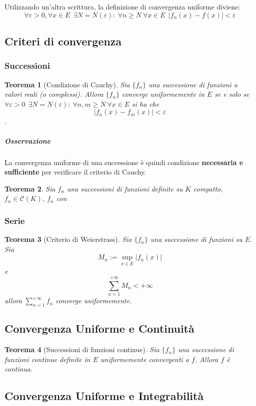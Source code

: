\documentclass[a4paper,12pt]{article}
\newtheorem{teo}{Teorema}
\begin{document}
Utilizzando un'altra scrittura, la definizione di convergenza uniforme diviene:
 $$\forall \varepsilon>0, \forall x \in E\ \ \exists N=N(\varepsilon):\ \forall n \geq N\ \forall x\in E\ \ |f_n(x) - f(x)| < \varepsilon$$ 

\subsection{Criteri di convergenza}

\subsubsection{Successioni}
\begin{teo}[Condizione di Cauchy]
Sia $\{f_n\}$ una successione di funzioni a valori reali (o complessi). Allora $\{f_n\}$ converge uniformemente in $E$ se e solo se $\forall \varepsilon>0\ \ \exists N=N(\varepsilon):\ \forall n,m \geq N\ \forall x\in E$ si ha che 
$$|f_n(x) - f_m(x)| < \varepsilon$$.
\end{teo}
\subparagraph*{Osservazione}
La convergenza uniforme di una successione è quindi condizione \textbf{necessaria e sufficiente} per verificare il criterio di Cauchy.
\begin{teo}
Sia ${f_n}$ una successioni di funzioni definite su $K$ compatto, $f_n \in \mathscr{C}(K)$, $f_n$ con
\end{teo}
\subsubsection{Serie}

\begin{teo}[Criterio di Weierstrass]
Sia $\{f_n\}$ una successione di funzioni su $E$. Sia $$M_n:= \displaystyle\sup_{x\in E}|f_n(x)|$$ e $$\sum_{n=1}^{+\infty}M_n<+\infty$$
allora $\displaystyle\sum_{n=1}^{+\infty}f_n$ converge uniformemente.
\end{teo}
\subsection{Convergenza Uniforme e Continuità}
\begin{teo}[Successioni di funzioni continue]
Sia $\{f_n\}$ una successione di funzioni continue definite in $E$ uniformemente convergenti a $f$. Allora $f$ è continua.
\end{teo}
\subsection{Convergenza Uniforme e Integrabilità}
\end{document}
